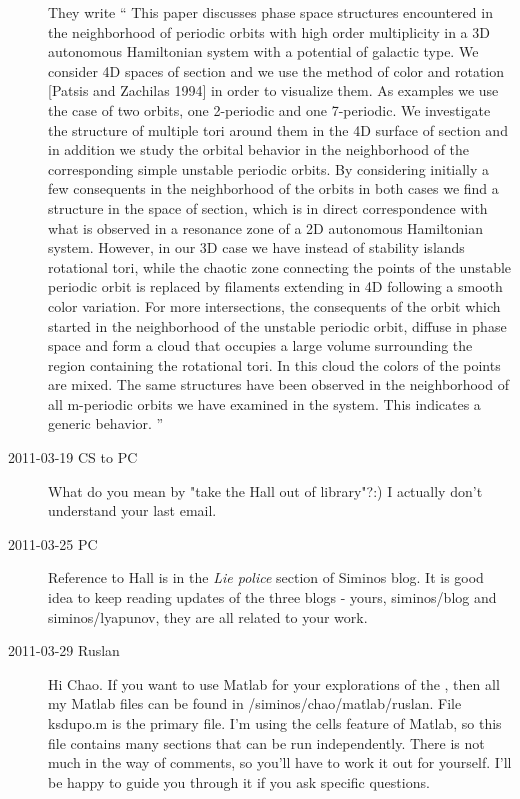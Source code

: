 \begin{description}
They write
``
This paper discusses phase space structures encountered in the neighborhood of periodic orbits with high order multiplicity in a 3D autonomous Hamiltonian system with a potential of galactic type. We consider 4D spaces of section and we use the method of color and rotation [Patsis and Zachilas 1994] in order to visualize them. As examples we use the case of two orbits, one 2-periodic and one 7-periodic. We investigate the structure of multiple tori around them in the 4D surface of section and in addition we study the orbital behavior in the neighborhood of the corresponding simple unstable periodic orbits. By considering initially a few consequents in the neighborhood of the orbits in both cases we find a structure in the space of section, which is in direct correspondence with what is observed in a resonance zone of a 2D autonomous Hamiltonian system. However, in our 3D case we have instead of stability islands rotational tori, while the chaotic zone connecting the points of the unstable periodic orbit is replaced by filaments extending in 4D following a smooth color variation. For more intersections, the consequents of the orbit which started in the neighborhood of the unstable periodic orbit, diffuse in phase space and form a cloud that occupies a large volume surrounding the region containing the rotational tori. In this cloud the colors of the points are mixed. The same structures have been observed in the neighborhood of all m-periodic orbits we have examined in the system. This indicates a generic behavior.
''

\item[2011-03-19 CS to PC]
What do you mean by "take the Hall out of library"?:) I actually don't understand your last email.

\item[2011-03-25 PC]
Reference to Hall is in the {\em Lie police} section of Siminos
blog. It is good idea to keep reading updates of the three blogs - yours,
siminos/blog and siminos/lyapunov, they are all related to your work.

\item[2011-03-29 Ruslan]
Hi Chao.  If you want to use Matlab for your explorations of the \KS, then all my Matlab files can be found in /siminos/chao/matlab/ruslan.  File ksdupo.m is the primary file.  I'm using the cells feature of Matlab, so this file contains many sections that can be run independently.  There is not much in the way of comments, so you'll have to work it out for yourself.  I'll be happy to guide you through it if you ask specific questions.


\end{description}
